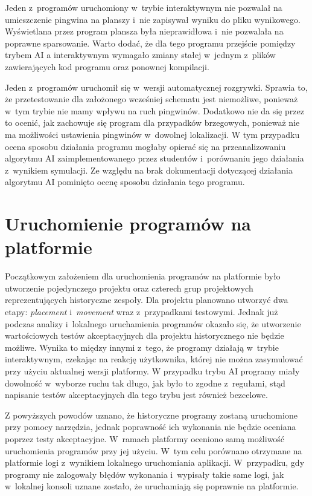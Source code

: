 Jeden z~programów uruchomiony w~trybie interaktywnym nie pozwalał na umieszczenie pingwina na planszy i~nie zapisywał wyniku do pliku wynikowego.
Wyświetlana przez program plansza była nieprawidłowa i~nie pozwalała na poprawne sparsowanie.
Warto dodać, że dla tego programu przejście pomiędzy trybem AI a interaktywnym wymagało zmiany stałej w~jednym z~plików zawierających kod programu oraz ponownej kompilacji.

Jeden z~programów uruchomił się w~wersji automatycznej rozgrywki.
Sprawia to, że przetestowanie dla założonego wcześniej schematu jest niemożliwe, ponieważ w~tym trybie nie mamy wpływu na ruch pingwinów.
Dodatkowo nie da się przez to ocenić, jak zachowuje się program dla przypadków brzegowych, ponieważ nie ma możliwości ustawienia pingwinów w~dowolnej lokalizacji.
W tym przypadku ocena sposobu działania programu mogłaby opierać się na przeanalizowaniu algorytmu AI zaimplementowanego przez studentów i~porównaniu jego działania z~wynikiem symulacji.
Ze względu na brak dokumentacji dotyczącej działania algorytmu AI pominięto ocenę sposobu działania tego programu.

\section{Uruchomienie programów na platformie}
\label{veryfication_platform}

Początkowym założeniem dla uruchomienia programów na platformie było utworzenie pojedynczego projektu oraz czterech grup projektowych reprezentujących historyczne zespoły.
Dla projektu planowano utworzyć dwa etapy: \textit{placement} i~\textit{movement} wraz z~przypadkami testowymi.
Jednak już podczas analizy i~lokalnego uruchamienia programów okazało się, że utworzenie wartościowych testów akceptacyjnych dla projektu historycznego nie będzie możliwe.
Wynika to między innymi z~tego, że programy działają w~trybie interaktywnym, czekając na reakcję użytkownika, której nie można zasymulować przy użyciu aktualnej wersji platformy.
W przypadku trybu AI programy miały dowolność w~wyborze ruchu tak długo, jak było to zgodne z~regułami, stąd napisanie testów akceptacyjnych dla tego trybu jest również bezcelowe.

Z powyższych powodów uznano, że historyczne programy zostaną uruchomione przy pomocy narzędzia, jednak poprawność ich wykonania nie będzie oceniana poprzez testy akceptacyjne.
W~ramach platformy oceniono samą możliwość uruchomienia programów przy jej użyciu.
W~tym celu porównano otrzymane na platformie logi z~wynikiem lokalnego uruchomiania aplikacji.
W~przypadku, gdy programy nie zalogowały błędów wykonania i~wypisały takie same logi, jak w~lokalnej konsoli uznane zostało, że uruchamiają się poprawnie na platformie.


